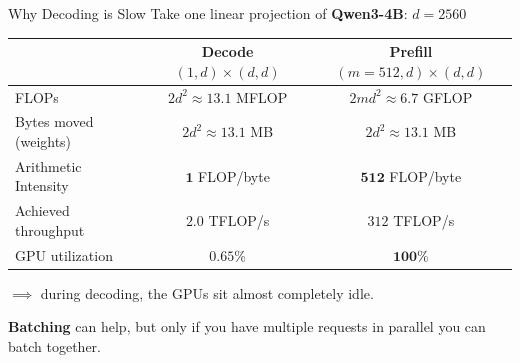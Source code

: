 \documentclass[aspectratio=169, 11pt]{beamer}
\begin{document}
\begin{frame}{Why Decoding is Slow}
Take one linear projection of \textbf{Qwen3-4B}: $d = 2560$ 

\vspace{0.3em}
\begin{table}
\centering
\small
\begin{tabular}{lcc}
\hline
 & \textbf{Decode} $(1,d)\times(d,d)$ & \textbf{Prefill} $(m{=}512,d)\times(d,d)$ \\
\hline
FLOPs & $2d^2 \approx 13.1$ MFLOP & $2md^2 \approx 6.7$ GFLOP \\
Bytes moved (weights) & $2d^2 \approx 13.1$ MB & $2d^2 \approx 13.1$ MB \\
Arithmetic Intensity & $\mathbf{1}$ FLOP/byte & $\mathbf{512}$ FLOP/byte \\
Achieved throughput & $2.0$ TFLOP/s & $312$ TFLOP/s \\
GPU utilization & $\mathbf{0.65\%}$ & $\mathbf{100\%}$ \\
\hline
\end{tabular}
\end{table}

$\implies$ during decoding, the GPUs sit almost completely idle.

\textbf{Batching} can help, but only if you have multiple requests 
in parallel you can batch together.
\end{frame}


%  
%  
%  
%  
%  
\end{document}

